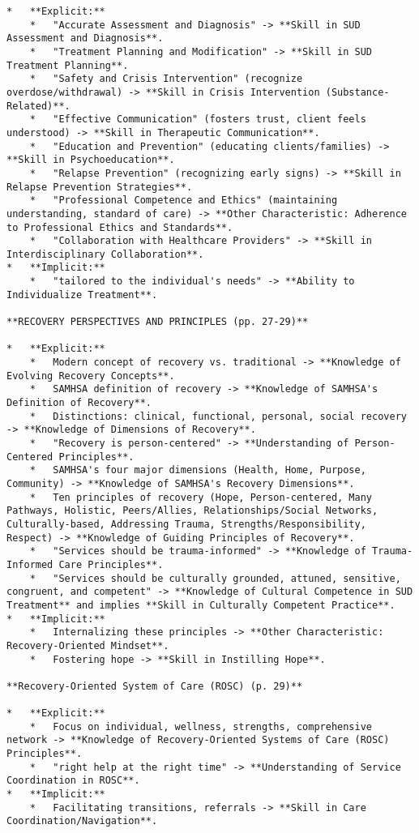 \documentclass[
  letterpaper,
  DIV=11,
  numbers=noendperiod]{scrartcl}
\begin{document}
\begin{verbatim}
*   **Explicit:**
    *   "Accurate Assessment and Diagnosis" -> **Skill in SUD Assessment and Diagnosis**.
    *   "Treatment Planning and Modification" -> **Skill in SUD Treatment Planning**.
    *   "Safety and Crisis Intervention" (recognize overdose/withdrawal) -> **Skill in Crisis Intervention (Substance-Related)**.
    *   "Effective Communication" (fosters trust, client feels understood) -> **Skill in Therapeutic Communication**.
    *   "Education and Prevention" (educating clients/families) -> **Skill in Psychoeducation**.
    *   "Relapse Prevention" (recognizing early signs) -> **Skill in Relapse Prevention Strategies**.
    *   "Professional Competence and Ethics" (maintaining understanding, standard of care) -> **Other Characteristic: Adherence to Professional Ethics and Standards**.
    *   "Collaboration with Healthcare Providers" -> **Skill in Interdisciplinary Collaboration**.
*   **Implicit:**
    *   "tailored to the individual's needs" -> **Ability to Individualize Treatment**.

**RECOVERY PERSPECTIVES AND PRINCIPLES (pp. 27-29)**

*   **Explicit:**
    *   Modern concept of recovery vs. traditional -> **Knowledge of Evolving Recovery Concepts**.
    *   SAMHSA definition of recovery -> **Knowledge of SAMHSA's Definition of Recovery**.
    *   Distinctions: clinical, functional, personal, social recovery -> **Knowledge of Dimensions of Recovery**.
    *   "Recovery is person-centered" -> **Understanding of Person-Centered Principles**.
    *   SAMHSA's four major dimensions (Health, Home, Purpose, Community) -> **Knowledge of SAMHSA's Recovery Dimensions**.
    *   Ten principles of recovery (Hope, Person-centered, Many Pathways, Holistic, Peers/Allies, Relationships/Social Networks, Culturally-based, Addressing Trauma, Strengths/Responsibility, Respect) -> **Knowledge of Guiding Principles of Recovery**.
    *   "Services should be trauma-informed" -> **Knowledge of Trauma-Informed Care Principles**.
    *   "Services should be culturally grounded, attuned, sensitive, congruent, and competent" -> **Knowledge of Cultural Competence in SUD Treatment** and implies **Skill in Culturally Competent Practice**.
*   **Implicit:**
    *   Internalizing these principles -> **Other Characteristic: Recovery-Oriented Mindset**.
    *   Fostering hope -> **Skill in Instilling Hope**.

**Recovery-Oriented System of Care (ROSC) (p. 29)**

*   **Explicit:**
    *   Focus on individual, wellness, strengths, comprehensive network -> **Knowledge of Recovery-Oriented Systems of Care (ROSC) Principles**.
    *   "right help at the right time" -> **Understanding of Service Coordination in ROSC**.
*   **Implicit:**
    *   Facilitating transitions, referrals -> **Skill in Care Coordination/Navigation**.


\end{verbatim}
\end{document}
